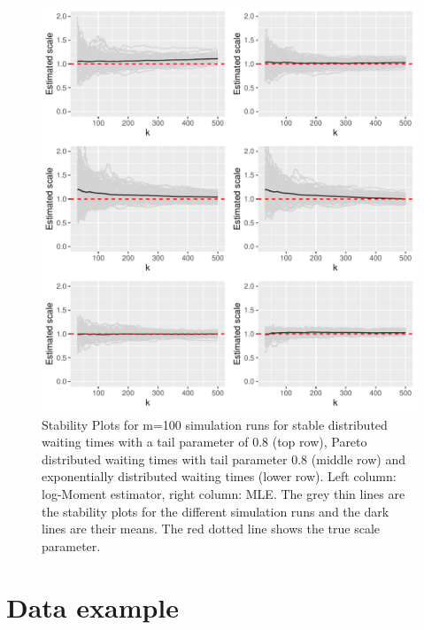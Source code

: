 \documentclass[]{elsarticle} %
\begin{document}
\begin{figure}

{\centering \includegraphics[width=1\linewidth]{article_springer_files/figure-latex/ScaleSimuplots-1} 

}

\caption{\label{Fig:ScaleSimu} Stability Plots for m=100 simulation runs for stable distributed waiting times with a tail parameter of 0.8 (top row), Pareto distributed waiting times with tail parameter 0.8 (middle row) and exponentially distributed waiting times (lower row). Left column: log-Moment estimator, right column: MLE. The grey thin lines are the stability plots for the different simulation runs and the dark lines are their means. The red dotted line shows the true scale parameter.}\label{fig:ScaleSimuplots}
\end{figure}

\hypertarget{data-example}{%
\section{Data example}\label{data-example}}
\end{document}
